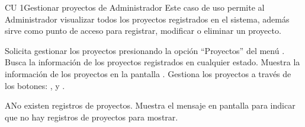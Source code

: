 \begin{UseCase}{CU 1}{Gestionar proyectos de Administrador}
	{
		Este caso de uso permite al Administrador visualizar todos los proyectos registrados en el sistema, además sirve como punto de acceso para registrar, modificar o eliminar un proyecto.
	}
	
	

	


\end{UseCase}
 \begin{UCtrayectoria}
    \UCpaso[\UCactor] Solicita gestionar los proyectos presionando la opción ``Proyectos'' del menú .
    \UCpaso[\UCsist] Busca la información de los proyectos registrados en cualquier estado. 
    \UCpaso[\UCsist] Muestra la información de los proyectos en la pantalla .
    \UCpaso[\UCactor] Gestiona los proyectos a través de los botones: , \btnEditar y \btnEliminar. \label{cu1:gestiona}
 \end{UCtrayectoria}
 
 \begin{UCtrayectoriaA}{A}{No existen registros de proyectos.}
    \UCpaso[\UCsist] Muestra el mensaje  en pantalla  
    para indicar que no hay registros de proyectos para mostrar.
 \end{UCtrayectoriaA}
 

